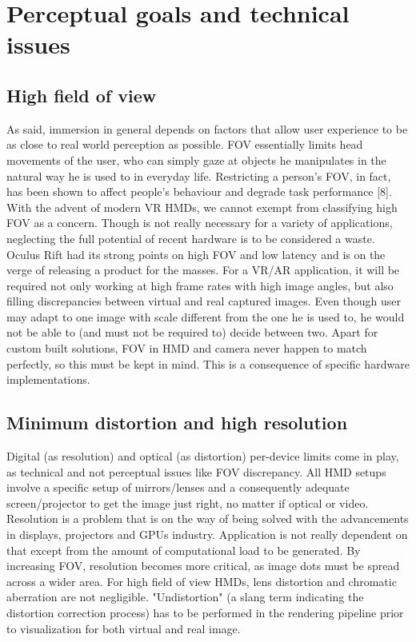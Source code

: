 \section{Perceptual goals and technical issues}
\subsection{High field of view}
As said, immersion in general depends on factors that allow user experience to be as close to real world perception as possible. FOV essentially limits head movements of the user, who can simply gaze at objects he manipulates in the natural way he is used to in everyday life. Restricting a person’s FOV, in fact, has been shown to affect people’s behaviour and degrade task performance [8]. With the advent of modern VR HMDs, we cannot exempt from classifying high FOV as a concern. Though is not really necessary for a variety of applications, neglecting the full potential of recent hardware is to be considered a waste. Oculus Rift had its strong points on high FOV and low latency and is on the verge of releasing a product for the masses. For a VR/AR application, it will be required not only working at high frame rates with high image angles, but also filling discrepancies between virtual and real captured images. Even though user may adapt to one image with scale different from the one he is used to, he would not be able to (and must not be required to) decide between two. Apart for custom built solutions, FOV in HMD and camera never happen to match perfectly, so this must be kept in mind. This is a consequence of specific hardware implementations.

\subsection{Minimum distortion and high resolution}
Digital (as resolution) and optical (as distortion) per-device limits come in play, as technical and not perceptual issues like FOV discrepancy. All HMD setups involve a specific setup of mirrors/lenses and a consequently adequate screen/projector to get the image just right, no matter if optical or video. Resolution is a problem that is on the way of being solved with the advancements in displays, projectors and GPUs industry. Application is not really dependent on that except from the amount of computational load to be generated. By increasing FOV, resolution becomes more critical, as image dots must be spread across a wider area.
For high field of view HMDs, lens distortion and chromatic aberration are not negligible. "Undistortion" (a slang term indicating the distortion correction process) has to be performed in the rendering pipeline prior to visualization for both virtual and real image.

